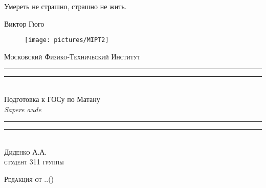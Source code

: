 \thispagestyle{empty}
\begingroup
{}
\epigraph{Умереть не страшно, страшно не жить.}{Виктор Гюго}\centering

\settowidth{\unitlength}{\LARGE\scshape Московский Физико-Технический Институт}
\vspace{-1.8\baselineskip}
\begin{figure}[!h]
	\center
	\texttt{[image: pictures/MIPT2]}
\end{figure}
\vspace*{0.5\baselineskip}
{\LARGE\scshape Московский Физико-Технический Институт}\\[0.7\baselineskip]
\rule{\unitlength}{1.6pt}\vspace*{-\baselineskip}\vspace*{2pt}
\rule{\unitlength}{0.4pt}\\[1.4\baselineskip]
{\Huge Подготовка к ГОСу по Матану}\\[\baselineskip]
{\large \itshape Sapere aude}\\[0.6\baselineskip]
\rule{\unitlength}{0.4pt}\vspace*{-1.5\baselineskip}\vspace{3.2pt}
\rule{\unitlength}{1.6pt}\\[\baselineskip]
{\Large\scshape Диденко А.А. \\\vspace*{0.2\baselineskip}  \normalsize студент 311 группы}\par
\vspace*{\baselineskip}  

{\LARGE\scshape Редакция от \twodigit\day.\twodigit\month.\the\year \;(\currenttime)}\par %

\bigskip
\vfill

